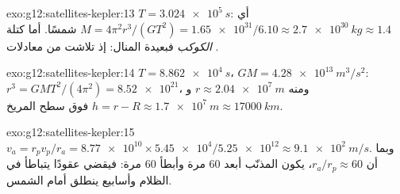 \begin{solution}{exo:g12:satellites-kepler:13}
$T = \qty{3.024e5}{s}$: أي $M = 4\pi^2 r^3/(GT^2) =
\num{1.65e31}/6.10 \approx \qty{2.7e30}{kg} \approx 1.4$ شمسًا. أما كتلة
\emph{الكوكب} فبعيدة المنال: إذ تلاشت من معادلات
.
\end{solution}

\begin{solution}{exo:g12:satellites-kepler:14}
$T = \qty{8.862e4}{s}$، $GM = \qty{4.28e13}{m^3/s^2}$:
$r^3 = GMT^2/(4\pi^2) = \num{8.52e21}$، ومنه $r \approx
\qty{2.04e7}{m}$ و$h = r - R \approx \qty{1.7e7}{m} \approx
\qty{17000}{km}$ فوق سطح المريخ.
\end{solution}

\begin{solution}{exo:g12:satellites-kepler:15}
$v_a = r_p v_p / r_a = \num{8.77e10} \times \num{5.45e4} /
\num{5.25e12} \approx \qty{9.1e2}{m/s}$. وبما أن $r_a/r_p \approx 60$،
يكون المذنّب أبعد $60$ مرة وأبطأ $60$ مرة: فيقضي
عقودًا يتباطأ في الظلام وأسابيع ينطلق أمام الشمس.
\end{solution}

